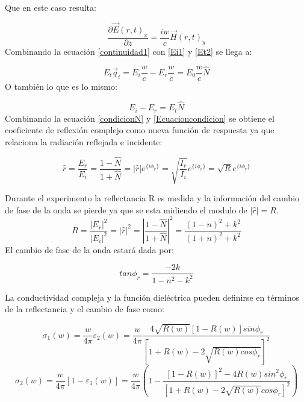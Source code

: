 \documentclass[a4paper,openright,12pt]{book}
\begin{document}
Que en este caso resulta:

\begin{equation}\label{continuidad1}
\frac{\partial \vec{E}(r,t)_{x}}{\partial z}=\frac{iw}{c}\vec{H}(r,t)_{y}
\end{equation}
Combinando la ecuación \ref{continuidad1} con \ref{Ei1} y \ref{Et2} se llega a:

\begin{equation}
E_{t}\vec{q}_{t}=E_{i}\frac{w}{c}-E_{r}\frac{w}{c}=E_{0}\frac{w}{c}\hat{N}
\end{equation}
O también lo que es lo mismo:

\begin{equation}\label{condicionN}
E_{i}-E_{r}=E_{t}\hat{N}
\end{equation}
Combinando la ecuación \ref{condicionN} y \ref{Ecuacioncondicion} se obtiene el coeficiente de reflexión complejo como nueva función de respuesta ya que relaciona la radiación reflejada e incidente:

\begin{equation}
\hat{r}=\frac{E_{r}}{E_{i}}=\frac{1-\hat{N}}{1+\hat{N}}=|\hat{r}|e^{\{i\phi_{r}\}}=\sqrt{\frac{I_{r}}{I_{i}}}e^{\{i\phi_{r}\}}=\sqrt{R}e^{\{i\phi_{r}\}}
\end{equation}

Durante el experimento la reflectancia R es medida  y la información del cambio de fase de la onda se pierde ya que se esta midiendo el modulo de $|\hat{r}|=R$.
\begin{equation}
R=\frac{|E_{r}|^{2}}{|E_{i}|^{2}}=|\hat{r}|^{2}=|\frac{1-\hat{N}}{1+\hat{N}}|^{2}=\frac{(1-n)^{2}+k^{2}}{(1+n)^{2}+k^{2}}
\end{equation}
El cambio de fase de la onda estará dada por:

\begin{equation}
tan\phi_{r}=\frac{-2k}{1-n^{2}-k^{2}}
\end{equation}

La conductividad compleja y la función dieléctrica pueden definirse  en términos de la reflectancia y el cambio de fase como:

\begin{equation}
\sigma_{1}(w)=\frac{w}{4\pi}\varepsilon_{2}(w)=\frac{w}{4\pi}\frac{4\sqrt{R(w)}[1-R(w)]sin\phi_{r}}{[1+R(w)-2\sqrt{R(w)cos\phi_{r}}]^{2}}
\end{equation}
\begin{equation}
\sigma_{2}(w)=\frac{w}{4\pi}[1-\varepsilon_{1}(w)]=\frac{w}{4\pi}(1-\frac{[1-R(w)]^{2}-4R(w)sin^{2}\phi_{r}}{[1+R(w)-2\sqrt{R(w)}cos\phi_{r}]^{2}})
\end{equation}
\end{document}
